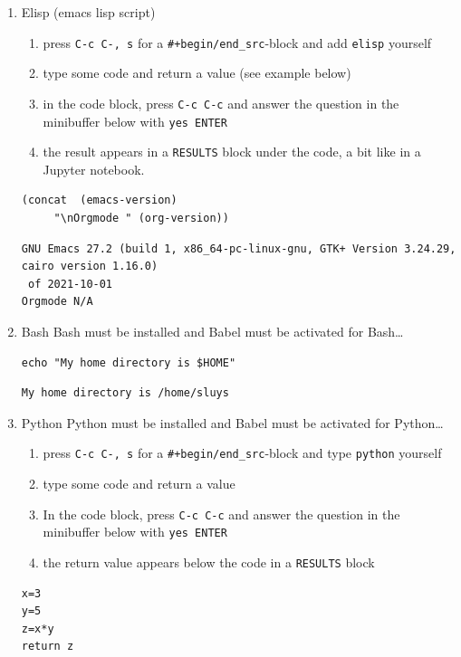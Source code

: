 \documentclass[11pt]{article}
\begin{document}
\begin{enumerate}
\item Elisp (emacs lisp script)
\label{sec:orga86e84b}
\begin{enumerate}
\item press \texttt{C-c C-, s} for a \texttt{\#+begin/end\_src}-block and add \texttt{elisp} yourself
\item type some code and return a value (see example below)
\item in the code block, press \texttt{C-c C-c} and answer the question in the minibuffer below with \texttt{yes ENTER}
\item the result appears in a \texttt{RESULTS} block under the code, a bit like in a Jupyter notebook.
\end{enumerate}
\begin{verbatim}
(concat  (emacs-version)
	 "\nOrgmode " (org-version))  
\end{verbatim}

\begin{verbatim}
GNU Emacs 27.2 (build 1, x86_64-pc-linux-gnu, GTK+ Version 3.24.29, cairo version 1.16.0)
 of 2021-10-01
Orgmode N/A
\end{verbatim}

\item Bash
\label{sec:orgca78b83}
Bash must be installed and Babel must be activated for Bash\ldots{}
\begin{verbatim}
echo "My home directory is $HOME"
\end{verbatim}

\begin{verbatim}
My home directory is /home/sluys
\end{verbatim}

\item Python
\label{sec:orgdf23cc6}
Python must be installed and Babel must be activated for Python\ldots{}

\begin{enumerate}
\item press \texttt{C-c C-, s} for a \texttt{\#+begin/end\_src}-block and type \texttt{python} yourself
\item type some code and return a value
\item In the code block, press \texttt{C-c C-c} and answer the question in the minibuffer below with \texttt{yes ENTER}
\item the return value appears below the code in a \texttt{RESULTS} block
\end{enumerate}
\begin{verbatim}
x=3
y=5
z=x*y
return z
\end{verbatim}


\end{enumerate}
\end{document}
